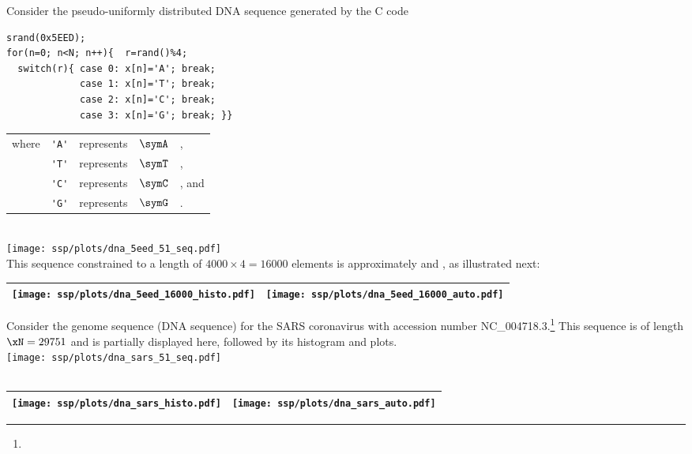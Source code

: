 \begin{example}
\label{ex:dna_5eed}
Consider the pseudo-uniformly distributed DNA sequence generated by the C code\footnotemark 
\\\begin{minipage}{85mm}%
\begin{lstlisting}
srand(0x5EED);
for(n=0; n<N; n++){  r=rand()%4;
  switch(r){ case 0: x[n]='A'; break;
             case 1: x[n]='T'; break;
             case 2: x[n]='C'; break;
             case 3: x[n]='G'; break; }}
\end{lstlisting}
\end{minipage}%
\hspace{10mm}%
\begin{tabular}{lclcl}
  where & \lstinline!'A'! &represents& $\symA$ &,
     \\ & \lstinline!'T'! &represents& $\symT$ &,
     \\ & \lstinline!'C'! &represents& $\symC$ &, and
     \\ & \lstinline!'G'! &represents& $\symG$ &.
\end{tabular}
  \\\texttt{[image: ssp/plots/dna\_5eed\_51\_seq.pdf]}\\
This sequence constrained to a length of $4000\times4=16000$ elements is approximately  and , 
as illustrated next:
  \\\begin{tabular}{|>{\scs}c|>{\scs}c|}
       \hline
       \texttt{[image: ssp/plots/dna\_5eed\_16000\_histo.pdf]}%
      &\texttt{[image: ssp/plots/dna\_5eed\_16000\_auto.pdf]}%
     \\\hline
  \end{tabular}
\end{example}

\begin{example}
\label{ex:dna_sars}
Consider the genome sequence (DNA sequence) for the SARS coronavirus with  accession number NC\_004718.3.\footnote{} %
This sequence is of length $\xN=29751$ and is partially displayed here, followed by its histogram and 
 plots.
  \\\texttt{[image: ssp/plots/dna\_sars\_51\_seq.pdf]}\\
     \\\begin{tabular}{|>{\scs}c|>{\scs}c|}
          \hline
          \texttt{[image: ssp/plots/dna\_sars\_histo.pdf]}%
         &\texttt{[image: ssp/plots/dna\_sars\_auto.pdf]}
        \\\hline
     \end{tabular}
\end{example}

